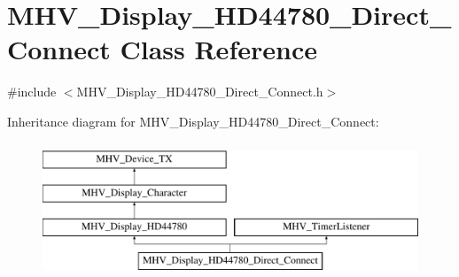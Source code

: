 \hypertarget{class_m_h_v___display___h_d44780___direct___connect}{
\section{\-M\-H\-V\-\_\-\-Display\-\_\-\-H\-D44780\-\_\-\-Direct\-\_\-\-Connect \-Class \-Reference}
\label{class_m_h_v___display___h_d44780___direct___connect}
}


{\ttfamily \#include $<$\-M\-H\-V\-\_\-\-Display\-\_\-\-H\-D44780\-\_\-\-Direct\-\_\-\-Connect.\-h$>$}

\-Inheritance diagram for \-M\-H\-V\-\_\-\-Display\-\_\-\-H\-D44780\-\_\-\-Direct\-\_\-\-Connect\-:\begin{figure}[H]
\begin{center}
\leavevmode
\includegraphics[height=4.000000cm]{class_m_h_v___display___h_d44780___direct___connect}
\end{center}
\end{figure}
